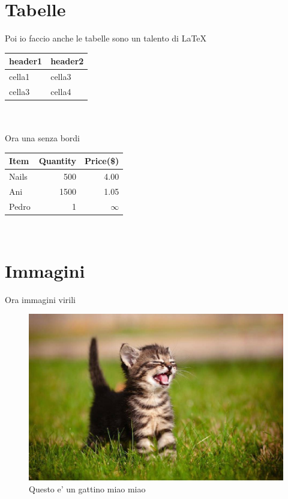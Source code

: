 \documentclass[a4paper,12pt]{article}
\begin{document}
\section{Tabelle}

Poi io faccio anche le tabelle sono un talento di \LaTeX \\
	\begin{tabular} %
	{|l|l|} %
		\hline %
		\textbf{header1} & %
			\textbf{header2}\\
		\hline
		cella1 & cella3 \\
		\hline
		cella3 & cella4\\
		\hline
	\end{tabular}
\\ \\
Ora una senza bordi \\

	\begin{tabular}{l|r|r}
		Item & Quantity & Price(\$) \\
		\hline
		Nails & 500 & 4.00 \\
		Ani & 1500 & 1.05 \\
		Pedro & 1 & $\infty$ \\ 
	\end{tabular}
\\ 

\section{Immagini}

Ora immagini virili \\
	\begin{figure}[h]
	\label{figuragattino} %
	\centering %
	\includegraphics[width=1\textwidth]{gattino.jpg}
	\caption{Questo e' un gattino miao miao} %
	\end{figure}
\\
\end{document}
